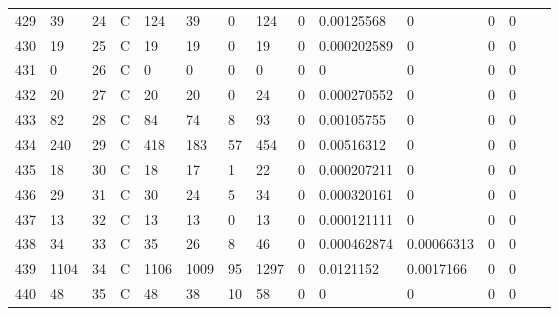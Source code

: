 \begin{longtable}{lllllllllllllll}
	429 & 39                & 24  & C   & 124               & 39                & 0                 & 124  & 0          & 0.00125568     & 0              & 0             & 0            \\
	430 & 19                & 25  & C   & 19                & 19                & 0                 & 19   & 0          & 0.000202589    & 0              & 0             & 0            \\
	431 & 0                 & 26  & C   & 0                 & 0                 & 0                 & 0    & 0          & 0              & 0              & 0             & 0            \\
	432 & 20                & 27  & C   & 20                & 20                & 0                 & 24   & 0          & 0.000270552    & 0              & 0             & 0            \\
	433 & 82                & 28  & C   & 84                & 74                & 8                 & 93   & 0          & 0.00105755     & 0              & 0             & 0            \\
	434 & 240               & 29  & C   & 418               & 183               & 57                & 454  & 0          & 0.00516312     & 0              & 0             & 0            \\
	435 & 18                & 30  & C   & 18                & 17                & 1                 & 22   & 0          & 0.000207211    & 0              & 0             & 0            \\
	436 & 29                & 31  & C   & 30                & 24                & 5                 & 34   & 0          & 0.000320161    & 0              & 0             & 0            \\
	437 & 13                & 32  & C   & 13                & 13                & 0                 & 13   & 0          & 0.000121111    & 0              & 0             & 0            \\
	438 & 34                & 33  & C   & 35                & 26                & 8                 & 46   & 0          & 0.000462874    & 0.00066313     & 0             & 0            \\
	439 & 1104              & 34  & C   & 1106              & 1009              & 95                & 1297 & 0          & 0.0121152      & 0.0017166      & 0             & 0            \\
	440 & 48                & 35  & C   & 48                & 38                & 10                & 58   & 0          & 0              & 0              & 0             & 0            \\

\end{longtable}
